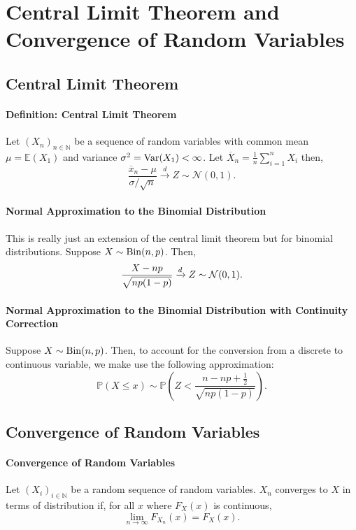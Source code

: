 \section{Central Limit Theorem and Convergence of Random Variables}

\subsection{Central Limit Theorem}

\paragraph{Definition: Central Limit Theorem}
Let \( (X_n)_{n \in  \mathbb{N}} \) be a sequence of random variables
with common mean  \( \mu = \mathbb{E}(X_1)  \) and variance
\( \sigma^2 = \mathrm{Var}(X_1) < \infty\).
Let \( \overline{X}_n = \frac{1}{n} \sum_{i=1}^n X_i \) then, \[
    \frac{\overline{x}_n - \mu}{\sigma / \sqrt{ n }}
    \xrightarrow{d}  Z \sim \mathcal{N}(0, 1)
.\]

\paragraph{Normal Approximation to the Binomial Distribution}
This is really just an extension of the central limit theorem but for
binomial distributions.
Suppose \( X \sim \mathrm{Bin}(n, p) \). Then, \[
    \frac{X - np}{\sqrt{np(1- p)}} \xrightarrow{d} Z \sim \mathcal{N}(0, 1)
.\]

\paragraph{Normal Approximation to the Binomial Distribution with Continuity Correction}
Suppose \( X \sim \mathrm{Bin}(n, p) \). Then, to account for the conversion from a discrete to
continuous variable, we make use the following approximation: \[
    \mathbb{P}(X \leq x) \sim \mathbb{P} \left( 
        Z < \frac{n - np + \frac{1}{2}}{\sqrt{np (1 - p)}}
    \right) 
.\] 

\subsection{Convergence of Random Variables}

\paragraph{Convergence of Random Variables}
Let \( (X_i)_{i \in  \mathbb{N}} \) be a random sequence of random variables.
\( X_n \) converges to  \( X \) in terms of distribution if,
for all \( x \) where  \( F_X(x) \) is continuous,  \[
    \lim_{n \to  \infty} F_{X_n}(x) = F_X(x)
.\]

